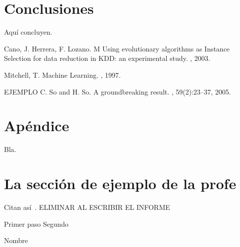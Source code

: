 \documentclass{ci5652}
\begin{document}
\section*{Conclusiones}

Aquí concluyen.


\small


\begin{thebibliography}{99}

Cano, J. Herrera, F. Lozano. M
\newblock Using evolutionary algorithms as Instance Selection for data
reduction in KDD: an experimental study.
, 2003.

Mitchell, T.
\newblock Machine Learning.
, 1997.

EJEMPLO C. So and H. So.
\newblock A groundbreaking result.
, 59(2):23--37, 2005.

\end{thebibliography}


\newpage
\section*{Apéndice}

Bla.


\section{La sección de ejemplo de la profe}
Citan así~\cite{so2005}. ELIMINAR AL ESCRIBIR EL INFORME

\begin{algorithm}
 \DontPrintSemicolon
 \vspace*{0.1cm}
 Primer paso\;
 Segundo\;
 \vspace*{0.1cm}
 \caption{Nombre}
\end{algorithm}
\end{document}
